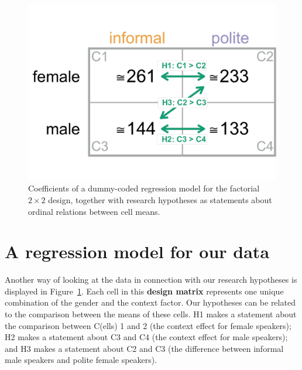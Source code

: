 \documentclass[nobib]{tufte-handout}
\newcommand{\tr}[1]{\textcolor{DarkOrange}{[tr: #1]}}
\begin{document}
\begin{figure}[h]
  \centering
    \includegraphics[angle=270, width = 1\textwidth]{pics/table_mean_hypotheses.pdf}
    \caption{Coefficients of a dummy-coded regression model for the factorial $2 \times 2$ design, together with research hypotheses as statements about ordinal relations between cell means.}
    \label{fig:BasicPlotData_table}
\end{figure}

\section{A regression model for our data}

Another way of looking at the data in connection with our research hypotheses is displayed in
Figure~\ref{fig:BasicPlotData_table}. Each cell in this \textbf{design matrix} represents one
unique combination of the gender and the context factor.
%
%
Our hypotheses can be related to the comparison between the means of these cells.
H1 makes a statement about the comparison between C(ells) 1 and 2 (the context effect for female speakers); H2 makes a statement about C3 and C4 (the context effect for male speakers); and H3 makes a statement about C2 and C3 (the difference between informal male speakers and polite female speakers).
\end{document}
